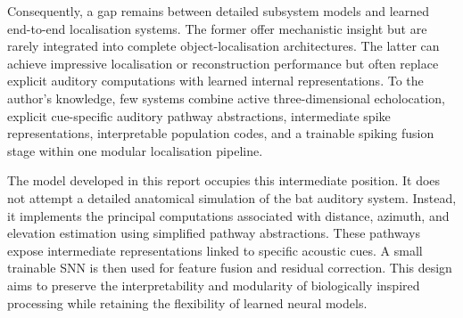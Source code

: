 Consequently, a gap remains between detailed subsystem models and learned end-to-end localisation systems. The former offer mechanistic insight but are rarely integrated into complete object-localisation architectures. The latter can achieve impressive localisation or reconstruction performance but often replace explicit auditory computations with learned internal representations. To the author's knowledge, few systems combine active three-dimensional echolocation, explicit cue-specific auditory pathway abstractions, intermediate spike representations, interpretable population codes, and a trainable spiking fusion stage within one modular localisation pipeline.

The model developed in this report occupies this intermediate position. It does not attempt a detailed anatomical simulation of the bat auditory system. Instead, it implements the principal computations associated with distance, azimuth, and elevation estimation using simplified pathway abstractions. These pathways expose intermediate representations linked to specific acoustic cues. A small trainable SNN is then used for feature fusion and residual correction. This design aims to preserve the interpretability and modularity of biologically inspired processing while retaining the flexibility of learned neural models.
